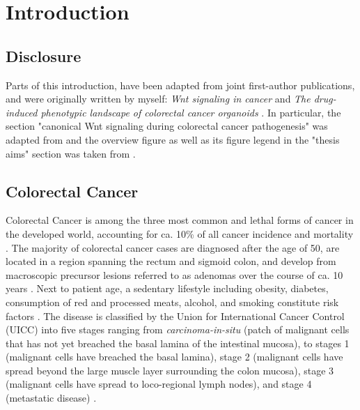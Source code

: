 \chapter{Introduction}
\label{introduction}
\begin{flushleft}
\setlength{\parindent}{7ex}
\section{Disclosure}
Parts of this introduction, have been adapted from joint first-author publications, and were originally written by myself: \textit{Wnt signaling in cancer} \parencite{zhanWntSignalingCancer2017} and \textit{The drug-induced phenotypic landscape of colorectal cancer organoids} \parencite{betgeDruginducedPhenotypicLandscape2022}. In particular, the section "canonical Wnt signaling during colorectal cancer pathogenesis" was adapted from \parencite{zhanWntSignalingCancer2017} and the overview figure as well as its figure legend in the "thesis aims" section was taken from \parencite{betgeDruginducedPhenotypicLandscape2022}.

\section{Colorectal Cancer}
Colorectal Cancer is among the three most common and lethal forms of cancer in the developed world, accounting for ca. 10\% of all cancer incidence and mortality \parencite{sungGlobalCancerStatistics2021}. The majority of colorectal cancer cases are diagnosed after the age of 50, are located in a region spanning the rectum and sigmoid colon, and develop from macroscopic precursor lesions referred to as adenomas over the course of ca. 10 years \parencite{choGeneticAlterationsAdenoma1992}. Next to patient age, a sedentary lifestyle including obesity, diabetes, consumption of red and processed meats, alcohol, and smoking constitute risk factors \parencite{sungGlobalCancerStatistics2021}. The disease is classified by the Union for International Cancer Control (UICC) into five stages ranging from \textit{carcinoma-in-situ} (patch of malignant cells that has not yet breached the basal lamina of the intestinal mucosa), to stages 1 (malignant cells have breached the basal lamina), stage 2 (malignant cells have spread beyond the large muscle layer surrounding the colon mucosa), stage 3 (malignant cells have spread to loco-regional lymph nodes), and stage 4 (metastatic disease) \parencite{vancutsemESMOConsensusGuidelines2016a}.
\par


\end{flushleft}
